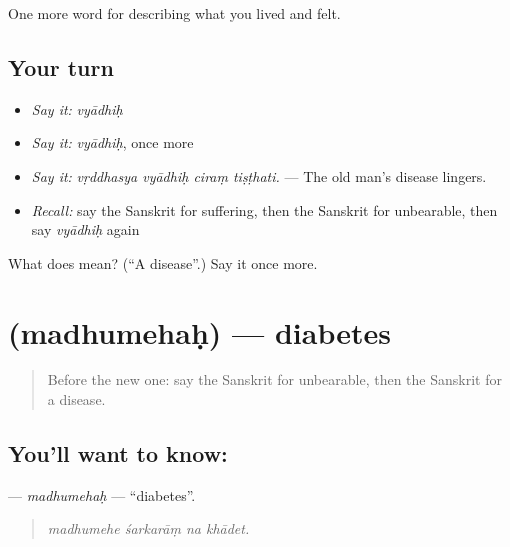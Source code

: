 \begin{grammarlens}[title={What you've built}]
One more word for describing what you lived and felt.
\end{grammarlens}

\subsection*{Your turn}
\begin{itemize}
\raggedright
  \item \emph{Say it:} \emph{vyādhiḥ}
  \item \emph{Say it:} \emph{vyādhiḥ}, once more
  \item \emph{Say it:} \emph{vṛddhasya vyādhiḥ ciraṃ tiṣṭhati.} — The old man's disease lingers.
  \item \emph{Recall:} say the Sanskrit for suffering, then the Sanskrit for unbearable, then say \emph{vyādhiḥ} again
\end{itemize}

\begin{tcolorbox}[breakable,colback=teal!4,colframe=teal!35!black,title={Before you move on}]
What does  mean? (\textquotedblleft{}A disease\textquotedblright{}.) Say it once more.
\end{tcolorbox}
\section[\texorpdfstring{\sk{मधुमेहः} (madhumehaḥ)}{मधुमेहः (madhumehaḥ)}]{ (madhumehaḥ) — diabetes}

\label{lesson:SA-C479-madhumehah}



\begin{quote}
Before the new one: say the Sanskrit for unbearable, then the Sanskrit for a disease.
\end{quote}

\subsection*{You'll want to know: }
\textbf{} — \emph{madhumehaḥ} — \textquotedblleft{}diabetes\textquotedblright{}.

\begin{quote}
   
\end{quote}

\begin{quote}
\emph{madhumehe śarkarāṃ na khādet.}
\end{quote}

